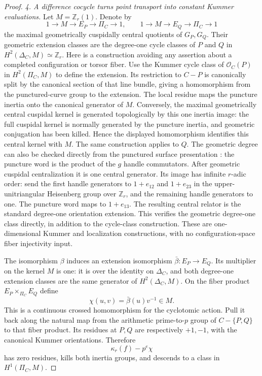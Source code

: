 \documentclass[11pt]{article}
\begin{document}
\begin{proof}
\emph{4. A difference cocycle turns point transport
into constant Kummer evaluations.}
Let \(M=\mathbb Z_r(1)\). Denote by
\[
  1\longrightarrow M\longrightarrow E_P
     \longrightarrow\Pi_C\longrightarrow1,
  \qquad
  1\longrightarrow M\longrightarrow E_Q
     \longrightarrow\Pi_C\longrightarrow1
                                                        \tag{A.88.2}
\]
the maximal geometrically cuspidally central
quotients of \(G_P,G_Q\). Their geometric
extension classes are the degree-one cycle classes
of \(P\) and \(Q\) in
\(H^2(\Delta_C,M)\simeq\mathbb Z_r\).
Here is a construction avoiding any assertion
about a completed configuration or torsor fiber.
Use the Kummer cycle class of
\(\mathcal O_C(P)\) in
\(H^2(\Pi_C,M)\) to define the extension.
Its restriction to \(C-P\) is canonically
split by the canonical section of that line
bundle, giving a homomorphism from the
punctured-curve group to the extension.
The local residue maps the puncture inertia
onto the canonical generator of \(M\).
Conversely, the maximal geometrically central
cuspidal kernel is generated topologically by
this one inertia image: the full cuspidal
kernel is normally generated by the puncture
inertia, and geometric conjugation has been
killed. Hence the displayed homomorphism
identifies this central kernel with \(M\).
The same construction applies to \(Q\).
The geometric degree can also be checked directly
from the punctured surface presentation
\cite[XIII, Corollary~2.12]{AR_SGA1}: the puncture
word is the product of the \(g\) handle commutators.
After geometric cuspidal centralization it is one central
generator. Its image has infinite \(r\)-adic order:
send the first handle generators to \(1+e_{12}\)
and \(1+e_{23}\) in the upper-unitriangular
Heisenberg group over \(\mathbb Z_r\), and the
remaining handle generators to one. The puncture word
maps to \(1+e_{13}\). The resulting central relator
is the standard degree-one orientation extension.
This verifies the geometric degree-one class directly,
in addition to the cycle-class construction.
These are one-dimensional Kummer and localization
constructions, with no configuration-space fiber
injectivity input.

The isomorphism \(\beta\) induces an extension
isomorphism \(\bar\beta:E_P\to E_Q\).
Its multiplier on the kernel \(M\) is one:
it is over the identity on \(\Delta_C\), and
both degree-one extension classes are the same
generator of \(H^2(\Delta_C,M)\).
On the fiber product \(E_P\times_{\Pi_C}E_Q\)
define
\[
                 \chi(u,v)=\bar\beta(u)v^{-1}\in M.
                                                        \tag{A.88.3}
\]
This is a continuous crossed homomorphism for the
cyclotomic action. Pull it back along the natural
map from the arithmetic prime-to-\(p\) group of
\(C-\{P,Q\}\) to that fiber product. Its residues
at \(P,Q\) are respectively \(+1,-1\), with
the canonical Kummer orientations. Therefore
\[
                         \kappa_r(f)-p^e\chi
                                                        \tag{A.88.4}
\]
has zero residues, kills both inertia groups, and
descends to a class in \(H^1(\Pi_C,M)\).


\end{proof}
\end{document}

